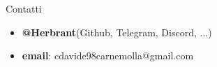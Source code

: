 \begin{frame}{Contatti}
    \begin{itemize}
        \item \textbf{@Herbrant}(Github, Telegram, Discord, ...)
        \item \textbf{email}: cdavide98carnemolla@gmail.com
    \end{itemize}
\end{frame}